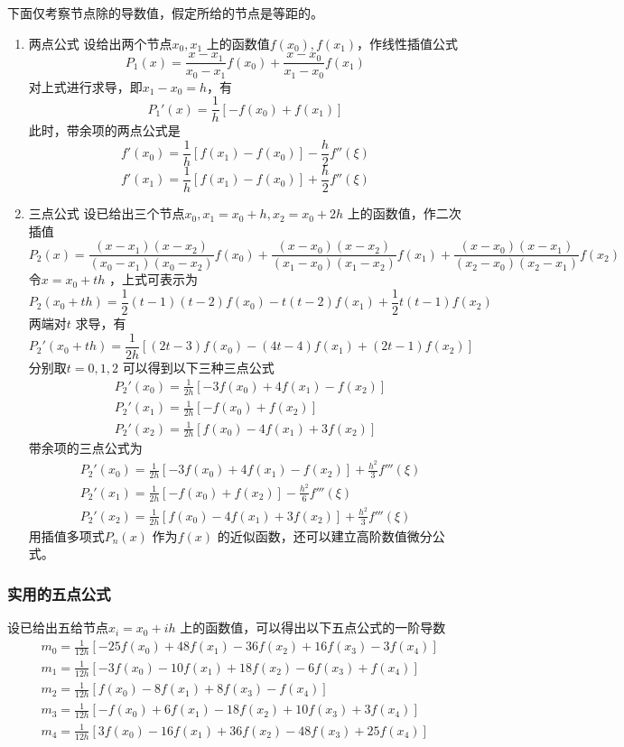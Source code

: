 \documentclass[a4paper]{article}
\begin{document}
下面仅考察节点除的导数值，假定所给的节点是等距的。
\begin{enumerate}
	\item 两点公式
		设给出两个节点$x_0, x_1$ 上的函数值$f(x_0), f(x_1)$，作线性插值公式
		\[
		P_1(x) = \frac{x - x_1}{x_0 - x_1} f(x_0) + \frac{x - x_0}{x_1 - x_0} f(x_1)
		\] 
		对上式进行求导，即$x_1 - x_0 = h$，有
		\[
			P_1'(x) = \frac{1}{h} [ -f(x_0) + f(x_1)]
		\] 
                此时，带余项的两点公式是
		\[
			f'(x_0) = \frac{1}{h} [f(x_1) - f(x_0)] - \frac{h}{2} f''(\xi)
		\] 
		\[
			f'(x_1) = \frac{1}{h} [f(x_1) - f(x_0)] + \frac{h}{2} f''(\xi)
		\] 
	\item 三点公式
		设已给出三个节点$x_0, x_1=x_0+h, x_2=x_0 + 2h$ 上的函数值，作二次插值
		\[
		P_2(x) = \frac{(x-x_1)(x-x_2)}{(x_0-x_1)(x_0-x_2)}f(x_0) + \frac{(x-x_0)(x-x_2)}{(x_1-x_0)(x_1-x_2)}f(x_1) + \frac{(x-x_0)(x-x_1)}{(x_2-x_0)(x_2-x_1)}f(x_2)
		\] 
		令$x = x_0 + th$ ，上式可表示为
		\[
		P_2(x_0 + th) = \frac{1}{2} (t-1) (t-2) f(x_0) - t (t-2) f(x_1) + \frac{1}{2} t(t-1)f(x_2)
		\] 
		两端对$t$ 求导，有
		\[
			P_2'(x_0 + th) = \frac{1}{2h} [(2t - 3) f(x_0) - (4t - 4) f(x_1) + (2t-1) f(x_2)] \tag{3.5.3} \label{eq:3.5.3} 
		\] 
		分别取$t=0,1,2$ 可以得到以下三种三点公式
		\[
		\begin{align*}
			&P_2'(x_0) = \frac{1}{2h} [-3 f(x_0) + 4 f(x_1) - f(x_2)] \\
			&P_2'(x_1) = \frac{1}{2h} [-f(x_0) + f(x_2)] \\
			&P_2'(x_2) = \frac{1}{2h} [f(x_{0}) - 4 f(x_1) + 3 f(x_2)]
		\end{align*}
		\] 
	        带余项的三点公式为	
		\[
		\begin{align*}
			&P_2'(x_0) = \frac{1}{2h} [-3 f(x_0) + 4 f(x_1) - f(x_2)] + \frac{h^2}{3} f'''(\xi) \\
			&P_2'(x_1) = \frac{1}{2h} [-f(x_0) + f(x_2)] - \frac{h^2}{6} f'''(\xi) \\
			&P_2'(x_2) = \frac{1}{2h} [f(x_{0}) - 4 f(x_1) + 3 f(x_2)] + \frac{h^2}{3} f'''(\xi)
		\end{align*}
		\] 
		用插值多项式$P_n(x)$ 作为$f(x)$ 的近似函数，还可以建立高阶数值微分公式。
\end{enumerate}

\subsubsection{实用的五点公式}
设已给出五给节点$x_{i} = x_0 + i h$ 上的函数值，可以得出以下五点公式的一阶导数
\[
\begin{align*}
& m_0 = \frac{1}{12h} [-25 f(x_0) + 48 f(x_1) - 36 f(x_2) + 16 f(x_3) - 3 f(x_4)] \\
& m_1 = \frac{1}{12h} [-3 f(x_0) - 10 f(x_1) + 18 f(x_2) - 6 f(x_3) + f(x_4)] \\
& m_2 = \frac{1}{12h} [f(x_0) - 8 f(x_1) + 8 f(x_3) -  f(x_4)] \\
& m_3 = \frac{1}{12h} [-f(x_0) + 6 f(x_1) - 18 f(x_2) + 10 f(x_3) + 3 f(x_4)] \\
& m_4 = \frac{1}{12h} [3f(x_0) - 16 f(x_1) + 36 f(x_2) - 48 f(x_3) + 25 f(x_4)] \\
\end{align*}
\] 
\end{document}
